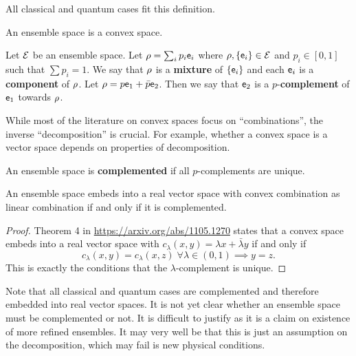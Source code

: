 \begin{remark}
	All classical and quantum cases fit this definition.
\end{remark}

\begin{coro}
	An ensemble space is a convex space.
\end{coro}

\begin{defn}
	Let $\Ens$ be an ensemble space. Let $\ens[\rho] = \sum_i p_i \ens_i$ where $\ens[\rho], \{\ens_i\} \in \Ens$ and $p_i \in [0,1]$ such that $\sum p_i = 1$. We say that $\ens[\rho]$ is a \textbf{mixture} of $\{\ens_i\}$ and each $\ens_i$ is a \textbf{component} of $\ens[\rho]$. Let $\ens[\rho] = p \ens_1 + \bar{p} \ens_2$. Then we say that $\ens_2$ is a $p$-\textbf{complement} of $\ens_1$ towards $\ens[\rho]$.
\end{defn}

\begin{remark}
	While most of the literature on convex spaces focus on ``combinations'', the inverse ``decomposition'' is crucial. For example, whether a convex space is a vector space depends on properties of decomposition.
\end{remark}

\begin{defn}
	An ensemble space is \textbf{complemented} if all $p$-complements are unique.
\end{defn}

\begin{prop}
	An ensemble space embeds into a real vector space with convex combination as linear combination if and only if it is complemented.
\end{prop}
\begin{proof}
	Theorem 4 in \url{https://arxiv.org/abs/1105.1270} states that a convex space embeds into a real vector space with $c_\lambda(x,y) = \lambda x + \bar{\lambda}y$ if and only if
	$$ c_\lambda(x,y) = c_\lambda(x,z) \; \forall \lambda \in (0,1) \implies y = z.$$ This is exactly the conditions that the $\lambda$-complement is unique.	
\end{proof}

\begin{remark}
	Note that all classical and quantum cases are complemented and therefore embedded into real vector spaces. It is not yet clear whether an ensemble space must be complemented or not. It is difficult to justify as it is a claim on existence of more refined ensembles. It may very well be that this is just an assumption on the decomposition, which may fail is new physical conditions.
\end{remark}

